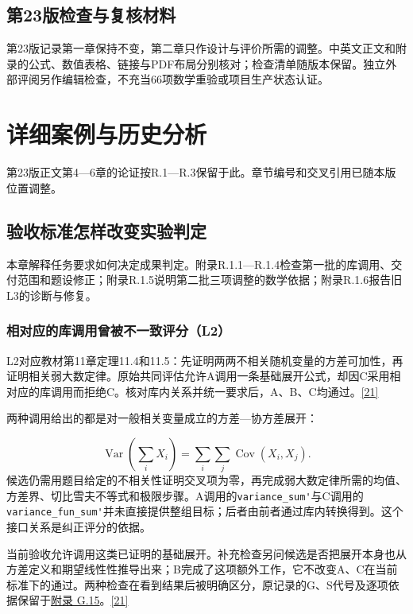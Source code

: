 \subsection[第23版检查与复核材料]{\texorpdfstring{\protect\hypertarget{q6}{}第23版检查与复核材料}{第23版检查与复核材料}}
第23版记录第一章保持不变，第二章只作设计与评价所需的调整。中英文正文和附录的公式、数值表格、链接与PDF布局分别核对；检查清单随版本保留。独立外部评阅另作编辑检查，不充当66项数学重验或项目生产状态认证。

\section[详细案例与历史分析]{\texorpdfstring{\protect\hypertarget{appendix-r}{}详细案例与历史分析}{详细案例与历史分析}}
第23版正文第4—6章的论证按R.1—R.3保留于此。章节编号和交叉引用已随本版位置调整。

\subsection[验收标准怎样改变实验判定]{\texorpdfstring{\protect\hypertarget{r1}{}验收标准怎样改变实验判定}{验收标准怎样改变实验判定}}
本章解释任务要求如何决定成果判定。附录R.1.1—R.1.4检查第一批的库调用、交付范围和题设修正；附录R.1.5说明第二批三项调整的数学依据；附录R.1.6报告旧L3的诊断与修复。

\subsubsection[相对应的库调用曾被不一致评分（L2）]{\texorpdfstring{\protect\hypertarget{r1-1}{}相对应的库调用曾被不一致评分（L2）}{相对应的库调用曾被不一致评分（L2）}}
L2对应教材第11章定理11.4和11.5：先证明两两不相关随机变量的方差可加性，再证明相关弱大数定律。原始共同评估允许A调用一条基础展开公式，却因C采用相对应的库调用而拒绝C。核对库内关系并统一要求后，A、B、C均通过。\href{zh.pdf\#ref-21}{\mbox{[21]}}

两种调用给出的都是对一般相关变量成立的方差—协方差展开：

\[
\operatorname{Var}\!\left(\sum_i X_i\right)
=\sum_i\sum_j\operatorname{Cov}(X_i,X_j).
\]
候选仍需用题目给定的不相关性证明交叉项为零，再完成弱大数定律所需的均值、方差界、切比雪夫不等式和极限步骤。A调用的\nolinkurl{variance_sum'}与C调用的\nolinkurl{variance_fun_sum'}并未直接提供整组目标；后者由前者通过库内转换得到。这个接口关系是纠正评分的依据。

当前验收允许调用这类已证明的基础展开。补充检查另问候选是否把展开本身也从方差定义和期望线性性推导出来；B完成了这项额外工作，它不改变A、C在当前标准下的通过。两种检查在看到结果后被明确区分，原记录的G、S代号及逐项依据保留于\href{zh-appendix.pdf\#g15}{附录 G.15}。\href{zh.pdf\#ref-21}{\mbox{[21]}}

